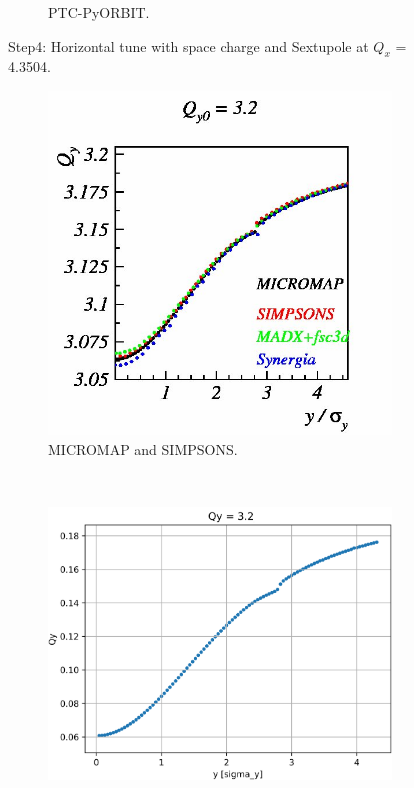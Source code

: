 \documentclass[a4paper]{cernatsnote}
\begin{document}
\begin{figure}
\begin{subfigure}{.5\textwidth}
          \caption{PTC-PyORBIT.}
          \label{fig:step4H_po}
        \end{subfigure}
        \caption{Step4: Horizontal tune with space charge and Sextupole at $Q_x$ = 4.3504.}
        \label{fig:step4H}
\end{figure}

\begin{figure}
        \centering
        \begin{subfigure}{.5\textwidth}
          \centering
          \includegraphics[width=\textwidth]{Step4_tune_y.png}
          \caption{MICROMAP and SIMPSONS.}
          \label{fig:step4V_m}
        \end{subfigure}~~~~~~
        \begin{subfigure}{.5\textwidth}
          \centering
          \includegraphics[width=\textwidth]{Step4_tune_y_PO.png}

\end{subfigure}
\end{figure}
\end{document}
